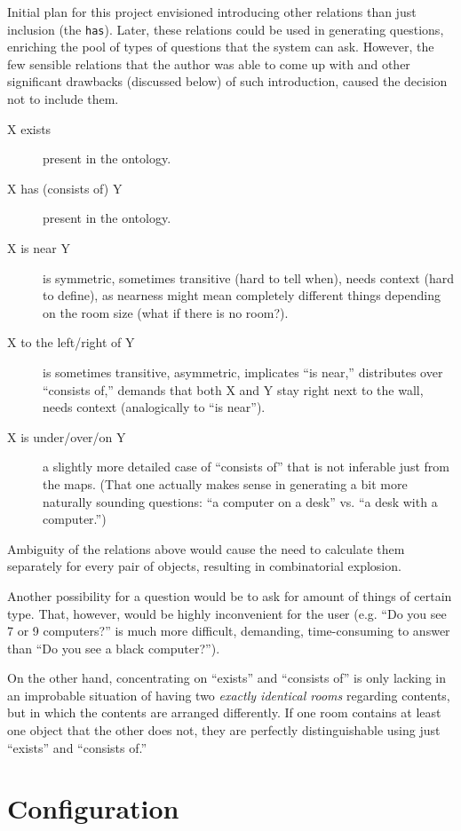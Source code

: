 Initial plan for this project envisioned introducing other relations than just inclusion (the \texttt{has}). Later, these relations could be used in generating questions, enriching the pool of types of questions that the system can ask. However, the few sensible relations that the author was able to come up with and other significant drawbacks (discussed below) of such introduction, caused the decision not to include them.

\begin{description}
	\item[X exists] present in the ontology.
	\item[X has (consists of) Y] present in the ontology.
	\item[X is near Y] is symmetric, sometimes transitive (hard to tell when), needs context (hard to define), as nearness might mean completely different things depending on the room size (what if there is no room?).
	\item[X to the left/right of Y] is sometimes transitive, asymmetric, implicates ``is near,'' distributes over ``consists of,'' demands that both X and Y stay right next to the wall, needs context (analogically to ``is near'').
	\item[X is under/over/on Y] a slightly more detailed case of ``consists of'' that is not inferable just from the maps. (That one actually makes sense in generating a bit more naturally sounding questions: ``a computer on a desk'' vs. ``a desk with a computer.'')
\end{description}

Ambiguity of the relations above would cause the need to calculate them separately for every pair of objects, resulting in combinatorial explosion.

Another possibility for a question would be to ask for amount of things of certain type. That, however, would be highly inconvenient for the user (e.g. ``Do you see 7 or 9 computers?'' is much more difficult, demanding, time-consuming to answer than ``Do you see a black computer?'').

On the other hand, concentrating on ``exists'' and ``consists of'' is only lacking in an improbable situation of having two \emph{exactly identical rooms} regarding contents, but in which the contents are arranged differently. If one room contains at least one object that the other does not, they are perfectly distinguishable using just ``exists'' and ``consists of.''

\section{Configuration}
\label{sec:configuration}

